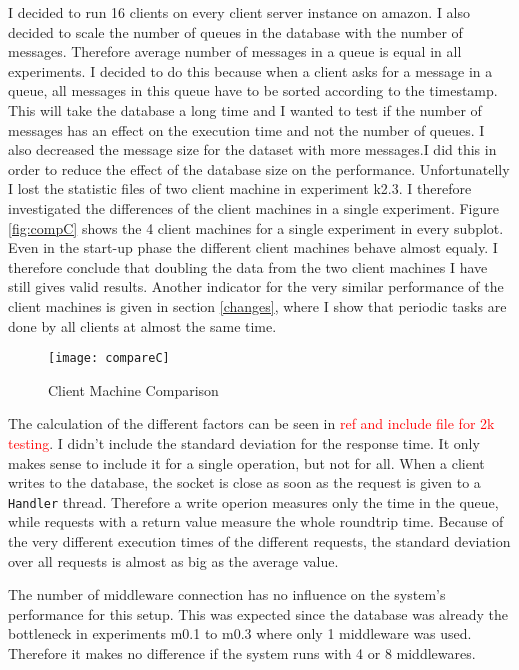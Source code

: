 \documentclass[
10pt, %
a4paper, %
oneside, %
headinclude,footinclude, %
BCOR5mm, %
]{scrartcl}
\newcommand\TODO[1]{\textcolor{red}{#1}}
\begin{document}
I decided to run 16 clients on every client server instance on amazon. I also decided to scale the number of queues in the database with the number of messages. Therefore average number of messages in a queue is equal in all experiments. I decided to do this because when a client asks for a message in a queue, all messages in this queue have to be sorted according to the timestamp. This will take the database a long time and I wanted to test if the number of messages has an effect on the execution time and not the number of queues. I also decreased the message size for the dataset with more messages.I did this in order to reduce the effect of the database size on the performance.
Unfortunatelly I lost the statistic files of two client machine in experiment k2.3. I therefore investigated the differences of the client machines in a single experiment. Figure \vref{fig:compC} shows the 4 client machines for a single experiment in every subplot. Even in the start-up phase the different client machines behave almost equaly. I therefore conclude that doubling the data from the two client machines I have still gives valid results. Another indicator for the very similar performance of the client machines is given in section \vref{changes}, where I show that periodic tasks are done by all clients at almost the same time.


\begin{figure}[H]
\begin{adjustwidth}{-2in}{-2in}
\centering
\texttt{[image: compareC]}
\caption{Client Machine Comparison}
\label{fig:compC}
\end{adjustwidth}
\end{figure}


The calculation of the different factors can be seen in \TODO{ref and include file for 2k testing}. I didn't include the standard deviation for the response time. It only makes sense to include it for a single operation, but not for all. When a client writes to the database, the socket is close as soon as the request is given to a \texttt{Handler} thread. Therefore a write operion measures only the time in the queue, while requests with a return value measure the whole roundtrip time. Because of the very different execution times of the different requests, the standard deviation over all requests is almost as big as the average value.

The number of middleware connection has no influence on the system's performance for this setup. This was expected since the database was already the bottleneck in experiments m0.1 to m0.3 where only 1 middleware was used. Therefore it makes no difference if the system runs with 4 or 8 middlewares.
\end{document}
